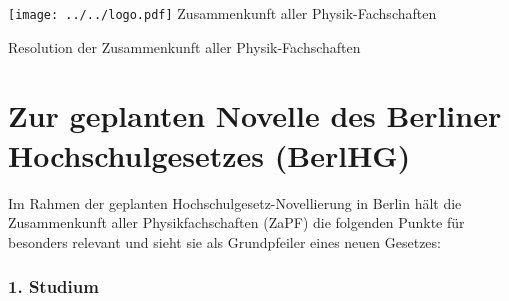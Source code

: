 \documentclass[DIV=calc]{scrartcl}
\begin{document}
\hspace{0.87\textwidth}
\begin{minipage}{120pt}
\vspace{-1.8cm}
\texttt{[image: ../../logo.pdf]}
\centering
\small Zusammenkunft aller Physik-Fachschaften
\end{minipage}

\begin{center}
\huge{Resolution der Zusammenkunft aller Physik-Fachschaften}\vspace{.25\baselineskip}\\
\normalsize
\end{center}
\vspace{1cm}


\section*{Zur geplanten Novelle des Berliner Hochschulgesetzes (BerlHG)}
Im Rahmen der geplanten Hochschulgesetz-Novellierung in Berlin hält die
Zusammenkunft aller Physikfachschaften (ZaPF) die folgenden Punkte für
besonders relevant und sieht sie als
Grundpfeiler eines neuen Gesetzes:


\hypertarget{studium}{%
\subsubsection*{1. Studium}\label{studium}}
\end{document}
